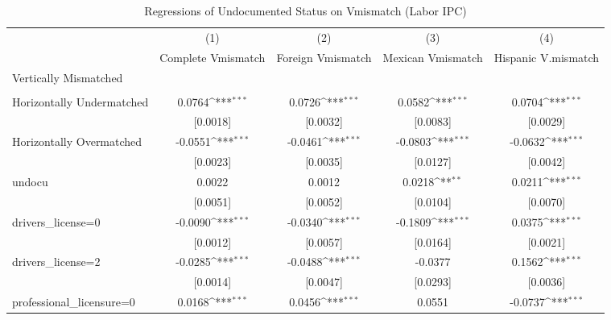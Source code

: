 \begin{table}[htbp]\centering
\def\sym#1{\ifmmode^{#1}\else\(^{#1}\)\fi}
\caption{Regressions of Undocumented Status on Vmismatch (Labor IPC)}
\begin{tabular}{l*{4}{c}}
\toprule
                    &\multicolumn{1}{c}{(1)}         &\multicolumn{1}{c}{(2)}         &\multicolumn{1}{c}{(3)}         &\multicolumn{1}{c}{(4)}         \\
                    &Complete Vmismatch         &Foreign Vmismatch         &Mexican Vmismatch         &Hispanic V.mismatch         \\
\midrule
Vertically Mismatched&                     &                     &                     &                     \\
                    &                     &                     &                     &                     \\
\addlinespace
Horizontally Undermatched&      0.0764\sym{***}&      0.0726\sym{***}&      0.0582\sym{***}&      0.0704\sym{***}\\
                    &    [0.0018]         &    [0.0032]         &    [0.0083]         &    [0.0029]         \\
\addlinespace
Horizontally Overmatched&     -0.0551\sym{***}&     -0.0461\sym{***}&     -0.0803\sym{***}&     -0.0632\sym{***}\\
                    &    [0.0023]         &    [0.0035]         &    [0.0127]         &    [0.0042]         \\
\addlinespace
undocu              &      0.0022         &      0.0012         &      0.0218\sym{**} &      0.0211\sym{***}\\
                    &    [0.0051]         &    [0.0052]         &    [0.0104]         &    [0.0070]         \\
\addlinespace
drivers\_license=0   &     -0.0090\sym{***}&     -0.0340\sym{***}&     -0.1809\sym{***}&      0.0375\sym{***}\\
                    &    [0.0012]         &    [0.0057]         &    [0.0164]         &    [0.0021]         \\
\addlinespace
drivers\_license=2   &     -0.0285\sym{***}&     -0.0488\sym{***}&     -0.0377         &      0.1562\sym{***}\\
                    &    [0.0014]         &    [0.0047]         &    [0.0293]         &    [0.0036]         \\
\addlinespace
professional\_licensure=0&      0.0168\sym{***}&      0.0456\sym{***}&      0.0551         &     -0.0737\sym{***}\\

\end{tabular}
\end{table}
